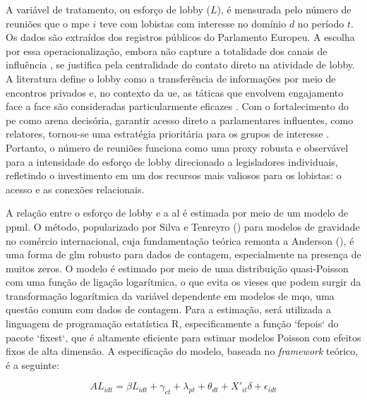 A variável de tratamento, ou esforço de lobby ($L$), é mensurada pelo número de reuniões que o \acrshort{mpe} $i$ teve com lobistas com interesse no domínio $d$ no período $t$. Os dados são extraídos dos registros públicos do Parlamento Europeu. A escolha por essa operacionalização, embora não capture a totalidade dos canais de influência \cite{dur_measuring_2008}, se justifica pela centralidade do contato direto na atividade de lobby. A literatura define o lobby como a transferência de informações por meio de encontros privados \cite{de_figueiredo_advancing_2014} e, no contexto da \acrshort{ue}, as táticas que envolvem engajamento face a face são consideradas particularmente eficazes \cite{Huwyler2022}. Com o fortalecimento do \acrshort{pe} como arena decisória, garantir acesso direto a parlamentares influentes, como relatores, tornou-se uma estratégia prioritária para os grupos de interesse \cite{kluver2015legislative, marshall2010lobby}. Portanto, o número de reuniões funciona como uma proxy robusta e observável para a intensidade do esforço de lobby direcionado a legisladores individuais, refletindo o investimento em um dos recursos mais valiosos para os lobistas: o acesso e as conexões relacionais.

A relação entre o esforço de lobby e a \acrshort{al} é estimada por meio de um modelo de \acrfull{ppml}. O método, popularizado por Silva e Tenreyro (\citeyear{silva2006log}) para modelos de gravidade no comércio internacional, cuja fundamentação teórica remonta a Anderson (\citeyear{anderson1979theoretical}), é uma forma de \acrfull{glm} robusto para dados de contagem, especialmente na presença de muitos zeros. O modelo é estimado por meio de uma distribuição quasi-Poisson com uma função de ligação logarítmica, o que evita os vieses que podem surgir da transformação logarítmica da variável dependente em modelos de \acrfull{mqo}, uma questão comum com dados de contagem. Para a estimação, será utilizada a linguagem de programação estatística R, especificamente a função `fepois` do pacote `fixest`, que é altamente eficiente para estimar modelos Poisson com efeitos fixos de alta dimensão. A especificação do modelo, baseada no \textit{framework} teórico, é a seguinte:

\begin{equation}
    \label{eq:modelo_final}
    AL_{idt} = \beta L_{idt} + \gamma_{ct} + \lambda_{pt} + \theta_{dt} + X'_{it}\delta + \epsilon_{idt}
\end{equation}

